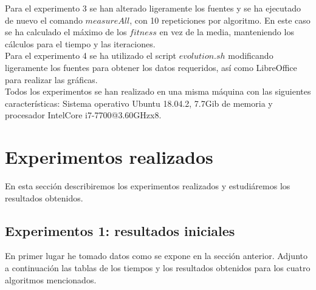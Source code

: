 \documentclass[11pt,a4paper]{article}
\begin{document}
	Para el experimento 3 se han alterado ligeramente los fuentes y se ha ejecutado de nuevo el comando $measureAll$, con 10 repeticiones por algoritmo. En este caso se ha calculado el máximo de los $fitness$ en vez de la media, manteniendo los cálculos para el tiempo y las iteraciones. \\
	
	Para el experimento 4 se ha utilizado el script $evolution.sh$ modificando ligeramente los fuentes para obtener los datos requeridos, así como LibreOffice para realizar las gráficas. \\
	
	Todos los experimentos se han realizado en una misma máquina con las siguientes características: Sistema operativo Ubuntu 18.04.2, 7.7Gib de memoria y procesador IntelCore i7-7700@3.60GHzx8.
	
	\section{Experimentos realizados}
	
	En esta sección describiremos los experimentos realizados y estudiáremos los resultados obtenidos. 
	
	\subsection{Experimentos 1: resultados iniciales}
	
	En primer lugar he tomado datos como se expone en la sección anterior. Adjunto a continuación las tablas de los tiempos y los resultados obtenidos para los cuatro algoritmos mencionados.
	
\end{document}
